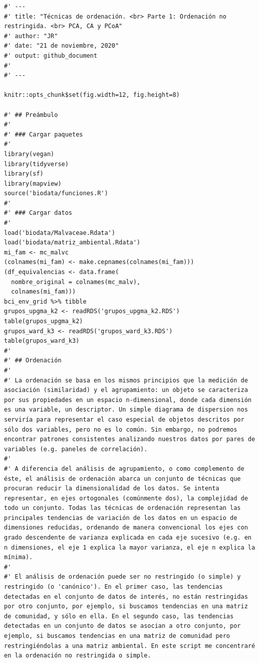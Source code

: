 \documentclass[11pt,]{article}
\begin{document}
\begin{verbatim}
#' ---
#' title: "Técnicas de ordenación. <br> Parte 1: Ordenación no restringida. <br> PCA, CA y PCoA"
#' author: "JR"
#' date: "21 de noviembre, 2020"
#' output: github_document
#' 
#' ---

knitr::opts_chunk$set(fig.width=12, fig.height=8)

#' ## Preámbulo
#' 
#' ### Cargar paquetes
#' 
library(vegan)
library(tidyverse)
library(sf)
library(mapview)
source('biodata/funciones.R')
#' 
#' ### Cargar datos
#' 
load('biodata/Malvaceae.Rdata')
load('biodata/matriz_ambiental.Rdata')
mi_fam <- mc_malvc
(colnames(mi_fam) <- make.cepnames(colnames(mi_fam)))
(df_equivalencias <- data.frame(
  nombre_original = colnames(mc_malv),
  colnames(mi_fam)))
bci_env_grid %>% tibble
grupos_upgma_k2 <- readRDS('grupos_upgma_k2.RDS')
table(grupos_upgma_k2)
grupos_ward_k3 <- readRDS('grupos_ward_k3.RDS')
table(grupos_ward_k3)
#' 
#' ## Ordenación
#' 
#' La ordenación se basa en los mismos principios que la medición de asociación (similaridad) y el agrupamiento: un objeto se caracteriza por sus propiedades en un espacio n-dimensional, donde cada dimensión es una variable, un descriptor. Un simple diagrama de dispersion nos serviría para representar el caso especial de objetos descritos por sólo dos variables, pero no es lo común. Sin embargo, no podremos encontrar patrones consistentes analizando nuestros datos por pares de variables (e.g. paneles de correlación).
#' 
#' A diferencia del análisis de agrupamiento, o como complemento de éste, el análisis de ordenación abarca un conjunto de técnicas que procuran reducir la dimensionalidad de los datos. Se intenta representar, en ejes ortogonales (comúnmente dos), la complejidad de todo un conjunto. Todas las técnicas de ordenación representan las principales tendencias de variación de los datos en un espacio de dimensiones reducidas, ordenando de manera convencional los ejes con grado descendente de varianza explicada en cada eje sucesivo (e.g. en n dimensiones, el eje 1 explica la mayor varianza, el eje n explica la mínima).
#' 
#' El análisis de ordenación puede ser no restringido (o simple) y restringido (o 'canónico'). En el primer caso, las tendencias detectadas en el conjunto de datos de interés, no están restringidas por otro conjunto, por ejemplo, si buscamos tendencias en una matriz de comunidad, y sólo en ella. En el segundo caso, las tendencias detectadas en un conjunto de datos se asocian a otro conjunto, por ejemplo, si buscamos tendencias en una matriz de comunidad pero restringiéndolas a una matriz ambiental. En este script me concentraré en la ordenación no restringida o simple.

\end{verbatim}
\end{document}
